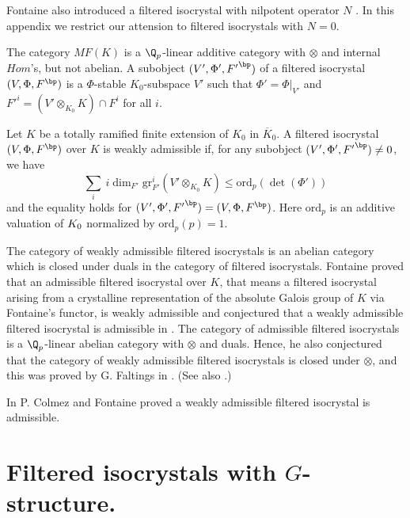 Fontaine also introduced a filtered isocrystal with nilpotent operator $N$ \cite{fontaine94:_repres}. 
In this appendix we restrict our attension to filtered isocrystals with $N = 0$. 

The category $MF(K)$ is a $\Q_p$-linear 
additive category with $\otimes$ and internal $Hom${}'s, but not abelian. 
A subobject $(V', \Phi', {F'}^{\bp})$ of a filtered isocrystal 
$(V, \Phi, F^{\bp})$ is a $\Phi$-stable $K_0$-subspace $V'$ 
such that $\Phi' = \Phi|_{V'}$ and ${F'}^i = (V' \otimes_{K_0} K) \cap F^i$ 
for all $i$. 

\begin{appdfn}
 \label{weakad}
 Let $K$ be a totally ramified finite extension of $K_0$ 
 in $\overline{K}_0$. 
 A filtered isocrystal $(V, \Phi, F^{\bp})$ over $K$ 
 is weakly admissible if, for any subobject 
 $(V', \Phi', {F'}^{\bp}) \ne 0$, we have 
 $$
      \displaystyle{\mathop{\sum}_i}\ i \dim_{F'} \mathrm{gr}^i_{F'}(V'
 \otimes_{K_0} K) 
                            \leq \mathrm{ord}_p(\det(\Phi'))
 $$
 and the equality holds for $(V', \Phi', {F'}^{\bp}) = (V, \Phi, F^{\bp})$. 
 Here $\mathrm{ord}_p$ is an additive valuation of $K\sb 0$ normalized by 
 $\mathrm{ord}_p(p) = 1$. 
\end{appdfn}

The category of weakly admissible filtered isocrystals 
is an abelian category 
which is closed under duals in the category of filtered 
isocrystals. 
Fontaine proved that an admissible filtered isocrystal over $K$, that means 
a filtered isocrystal arising from a crystalline representation 
of the absolute Galois group of $K$ via Fontaine's functor, is weakly admissible 
and conjectured that a weakly admissible filtered isocrystal is admissible 
in \cite{mgmfeadb}. 
The category of admissible filtered isocrystals is 
a $\Q_p$-linear abelian category with $\otimes$ and duals. 
Hence, he also conjectured that the category of weakly admissible filtered 
isocrystals is closed under $\otimes$, 
and this was proved by G. Faltings in \cite{midag}. (See also \cite{tpipht}.)

In \cite{colmez00:_const} P. Colmez and Fontaine proved a weakly admissible filtered 
isocrystal is admissible. 


\section{Filtered isocrystals with $G$-structure.}

